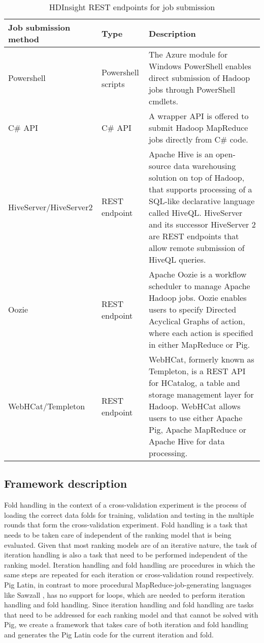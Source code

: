 \begin{table}
\centering
\begin{tabular}{p{4.2cm}p{2.6cm}p{5.5cm}}\toprule
Job submission method & Type & Description \\
\midrule
Powershell & Powershell scripts & The Azure module for Windows PowerShell enables direct submission of Hadoop jobs through PowerShell cmdlets.\\
C\# API & C\# API & A wrapper API is offered to submit Hadoop MapReduce jobs directly from C\# code.\\
HiveServer/HiveServer2 & REST endpoint & Apache Hive \cite{Thusoo2009} is an open-source data warehousing solution on top of Hadoop, that supports processing of a SQL-like declarative language called HiveQL. HiveServer and its successor HiveServer 2 are REST endpoints that allow remote submission of HiveQL queries.\\
Oozie & REST endpoint & Apache Oozie \cite{Islam2012} is a workflow scheduler to manage Apache Hadoop jobs. Oozie enables users to specify Directed Acyclical Graphs of action, where each action is specified in either MapReduce or Pig.\\
WebHCat/Templeton & REST endpoint & WebHCat, formerly known as Templeton, is a REST API for HCatalog, a table and storage management layer for Hadoop. WebHCat allows users to use either Apache Pig, Apache MapReduce or Apache Hive for data processing.\\	
\bottomrule
\end{tabular}
\caption{HDInsight REST endpoints for job submission}
\label{tbl:hdinsight_endpoints}
\end{table}

\subsection{Framework description}
Fold handling in the context of a cross-validation experiment is the process of loading the correct data folds for training, validation and testing in the multiple rounds that form the cross-validation experiment. Fold handling is a task that needs to be taken care of independent of the ranking model that is being evaluated. Given that most ranking models are of an iterative nature, the task of iteration handling is also a task that need to be performed independent of the ranking model. Iteration handling and fold handling are procedures in which the same steps are repeated for each iteration or cross-validation round respectively. Pig Latin, in contrast to more procedural MapReduce-job-generating languages like Sawzall \cite{Pike2005}, has no support for loops, which are needed to perform iteration handling and fold handling. Since iteration handling and fold handling are tasks that need to be addressed for each ranking model and that cannot be solved with Pig, we create a framework that takes care of both iteration and fold handling and generates the Pig Latin code for the current iteration and fold.\\

